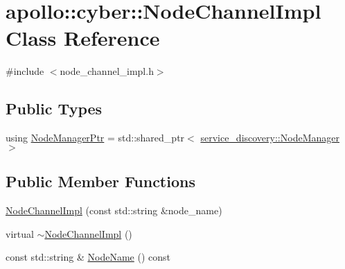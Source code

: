 \hypertarget{classapollo_1_1cyber_1_1NodeChannelImpl}{\section{apollo\-:\-:cyber\-:\-:Node\-Channel\-Impl Class Reference}
\label{classapollo_1_1cyber_1_1NodeChannelImpl}
}


{\ttfamily \#include $<$node\-\_\-channel\-\_\-impl.\-h$>$}

\subsection*{Public Types}
\begin{DoxyCompactItemize}
\item 
using \hyperlink{classapollo_1_1cyber_1_1NodeChannelImpl_a76419b008ecf39b123338689c251b253}{Node\-Manager\-Ptr} = std\-::shared\-\_\-ptr$<$ \hyperlink{classapollo_1_1cyber_1_1service__discovery_1_1NodeManager}{service\-\_\-discovery\-::\-Node\-Manager} $>$
\end{DoxyCompactItemize}
\subsection*{Public Member Functions}
\begin{DoxyCompactItemize}
\item 
\hyperlink{classapollo_1_1cyber_1_1NodeChannelImpl_ac50ae040942a835396f296213b3f030a}{Node\-Channel\-Impl} (const std\-::string \&node\-\_\-name)
\item 
virtual \hyperlink{classapollo_1_1cyber_1_1NodeChannelImpl_aeaed99822b9bc30590213d62179f387f}{$\sim$\-Node\-Channel\-Impl} ()
\item 
const std\-::string \& \hyperlink{classapollo_1_1cyber_1_1NodeChannelImpl_a2b099aa90db9523d1a6db5629acb77a6}{Node\-Name} () const 
\end{DoxyCompactItemize}
